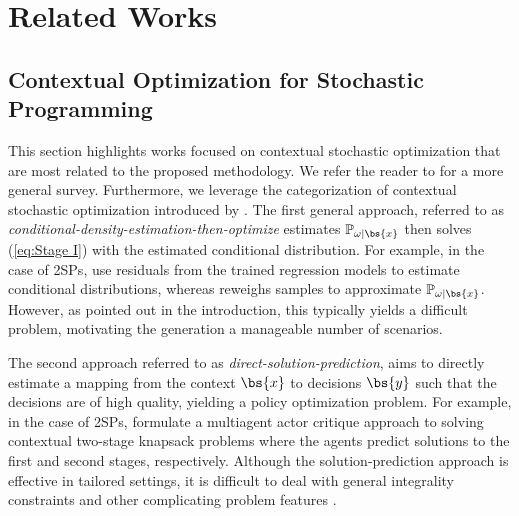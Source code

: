\section{Related Works}
\label{section:Literature}


\subsection{Contextual Optimization for Stochastic Programming}


This section highlights works focused on contextual stochastic optimization that are most related to the proposed methodology. We refer the reader to \citet{sadana2024survey} for a more general survey.  Furthermore, we leverage the categorization of contextual stochastic optimization introduced by \citet{estes2023smart}. The first general approach, referred to as \textit{conditional-density-estimation-then-optimize} estimates $\mathbb{P}_{\omega|\bs{x}}$ then solves (\ref{eq:Stage I}) with the estimated conditional distribution. For example, in the case of 2SPs, \citet{ban2019dynamic} use residuals from the trained regression models to estimate conditional distributions, whereas \citet{bertsimas2020predictive} reweighs samples to approximate $\mathbb{P}_{\omega|\bs{x}}$. However, as pointed out in the introduction, this typically yields a difficult problem, motivating the generation a manageable number of scenarios. 

The second approach referred to as \textit{direct-solution-prediction}, aims to directly estimate a mapping from the context $\bs{x}$ to decisions $\bs{y}$ such that the decisions are of high quality, yielding a policy optimization problem. For example, in the case of 2SPs, \citet{yilmaz2023deep} formulate a multiagent actor critique approach to solving contextual two-stage knapsack problems where the agents predict solutions to the first and second stages, respectively. Although the solution-prediction approach is effective in tailored settings, it is difficult to deal with general integrality constraints and other complicating problem features \citep{patel2022neur2sp,zharmagambetov2023landscape}. 

